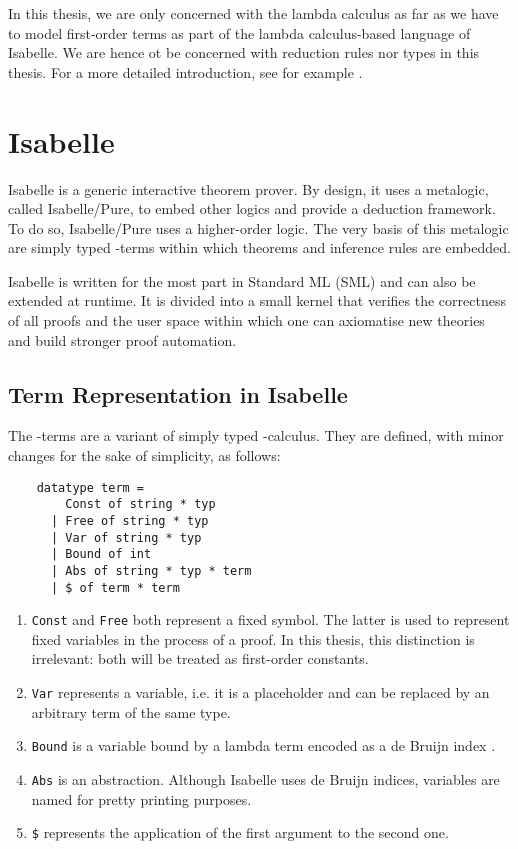 In this thesis, we are only concerned with the lambda calculus as far as we have to model first-order terms as part of the lambda calculus-based language of Isabelle. We are hence ot be concerned with reduction rules nor types in this thesis. For a more detailed introduction, see for example \cite{loader_notes_1998}.

\section{Isabelle}
Isabelle is a generic interactive theorem prover. By design, it uses a metalogic, called Isabelle/Pure, to embed other logics and provide a deduction framework. To do so, Isabelle/Pure uses a higher-order logic. The very basis of this metalogic are simply typed \lam -terms within which theorems and inference rules are embedded. \cite{wenzel_isabelleisar_2021}

Isabelle is written for the most part in Standard ML (SML) and can also be extended at runtime. It is divided into a small kernel that verifies the correctness of all proofs and the user space within which one can axiomatise new theories and build stronger proof automation.

\subsection{Term Representation in Isabelle}
The \lam -terms are a variant of simply typed \lam -calculus. They are defined, with minor changes for the sake of simplicity, as follows:
\begin{lstlisting}
    datatype term =
        Const of string * typ
      | Free of string * typ
      | Var of string * typ
      | Bound of int
      | Abs of string * typ * term
      | $ of term * term
\end{lstlisting} %
\vspace{-12pt}
\begin{enumerate}
  \item \lstinline{Const} and \lstinline{Free} both represent a fixed symbol. The latter is used to represent fixed variables in the process of a proof. In this thesis, this distinction is irrelevant: both will be treated as first-order constants.
  \item \lstinline{Var} represents a variable, i.e. it is a placeholder and can be replaced by an arbitrary term of the same type.
  \item \lstinline{Bound} is a variable bound by a lambda term encoded as a de Bruijn index \cite{bruijn_lambda_nodate}.
  \item \lstinline{Abs} is an abstraction. Although Isabelle uses de Bruijn indices, variables are named for pretty printing purposes.
  \item \lstinline{$} represents the application of the first argument to the second one.
\end{enumerate} %

